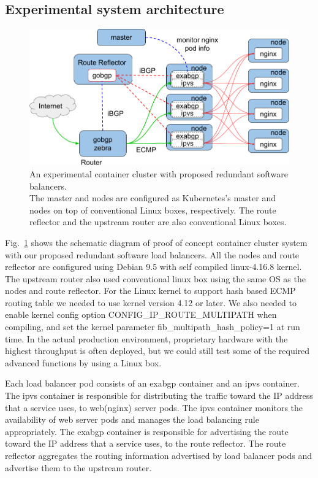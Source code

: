 \subsection{Experimental system architecture}

\begin{figure}[tb]
\begin{center}
\includegraphics[width=\columnwidth]{Figs/poc.png}
\end{center}
\caption{
  An experimental container cluster with proposed redundant software balancers. \\ %
  The master and nodes are configured as Kubernetes's master and nodes on top of conventional Linux boxes, respectively.
  The route reflector and the upstream router are also conventional Linux boxes.
}
\label{fig:poc}
\end{figure}

Fig.~\ref{fig:poc} shows the schematic diagram of proof of concept container cluster system with our proposed redundant software load balancers.
All the nodes and route reflector are configured using Debian 9.5 with self compiled linux-4.16.8 kernel.  
The upstream router also used conventional linux box using the same OS as the nodes and route reflector.
For the Linux kernel to support hash based ECMP routing table we needed to use kernel version 4.12 or later.
We also needed to enable kernel config option CONFIG\_IP\_ROUTE\_MULTIPATH\cite{ip-sysctl} when compiling, and set the kernel parameter fib\_multipath\_hash\_policy=1 at run time.
In the actual production environment, proprietary hardware with the highest throughput is often deployed, but we could still test some of the required advanced functions by using a Linux box.

Each load balancer pod consists of an exabgp container and an ipvs container.
The ipvs container is responsible for distributing the traffic toward the IP address that a service uses, to web(nginx) server pods.
The ipvs container monitors the availability of web server pods and manages the load balancing rule appropriately.
The exabgp container is responsible for advertising the route toward the IP address that a service uses, to the route reflector.
The route reflector aggregates the routing information advertised by load balancer pods and advertise them to the upstream router.

